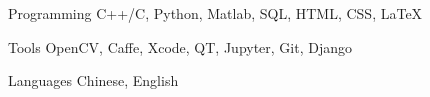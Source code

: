 

\begin{cvskills}

  \cvskill
    {Programming} %
    {C++/C, Python, Matlab, SQL, HTML, CSS, LaTeX} %

  \cvskill
    {Tools} %
    {OpenCV, Caffe, Xcode, QT, Jupyter, Git, Django} %

  \cvskill
    {Languages} %
    {Chinese, English} %

\end{cvskills}
